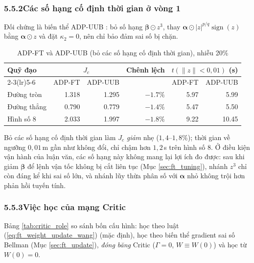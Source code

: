 \documentclass[12pt,a4paper]{article}
\makeatletter
\newcommand{\seclabel}[2]{\phantomsection\protected@edef\@currentlabel{#2}\label{#1}}
\DeclareMathOperator{\sign}{sign}
\makeatother
\begin{document}
\subsubsection*{5.5.2\quad Các số hạng cố định thời gian ở vòng 1}
\seclabel{sec:ft_terms}{5.5.2}

Đối chứng là biến thể ADP-UUB \cite{Wang2025}: bỏ số hạng $\bm\beta \odot z^3$, thay $\bm\alpha \odot |z|^{p/q}\sign(z)$ bằng $\bm\alpha \odot z$ và đặt $\kappa_2 = 0$, nên chỉ bảo đảm sai số bị chặn.

\begin{table}[H]
\centering
\caption{ADP-FT và ADP-UUB (bỏ các số hạng cố định thời gian), nhiễu 20\%}
\label{tab:ablation_uub}
\small
\begin{tabular}{lrrrrr}
\toprule
\multirow{2}{*}{\textbf{Quỹ đạo}} & \multicolumn{2}{c}{$J_c$} & \multirow{2}{*}{\textbf{Chênh lệch}} & \multicolumn{2}{c}{$t(\|z\| < 0{,}01)$ (s)} \\
\cmidrule(lr){2-3}\cmidrule(lr){5-6}
 & ADP-FT & ADP-UUB & & ADP-FT & ADP-UUB \\
\midrule
Đường tròn & 1.318 & 1.295 & $-1.7\%$ & 5.97 & 5.99 \\
Đường thẳng & 0.790 & 0.779 & $-1.4\%$ & 5.47 & 5.50 \\
Hình số 8 & 2.033 & 1.997 & $-1.8\%$ & 9.22 & 10.45 \\
\bottomrule
\end{tabular}
\end{table}

Bỏ các số hạng cố định thời gian làm $J_c$ \textit{giảm} nhẹ ($1{,}4$--$1{,}8\%$); thời gian về ngưỡng $0{,}01$\,m gần như không đổi, chỉ chậm hơn $1{,}2$\,s trên hình số 8. Ở điều kiện vận hành của luận văn, các số hạng này không mang lại lợi ích đo được: sau khi giảm $\bm\beta$ để lệnh vận tốc không bị cắt liên tục (Mục \ref{sec:ft_tuning}), nhánh $z^3$ chỉ còn đáng kể khi sai số lớn, và nhánh lũy thừa phân số với $\bm\alpha$ nhỏ không trội hơn phản hồi tuyến tính.

\subsubsection*{5.5.3\quad Việc học của mạng Critic}
\seclabel{sec:critic_results}{5.5.3}

Bảng \ref{tab:critic_role} so sánh bốn cấu hình: học theo luật (\ref{eq:ft_weight_update_wang}) (mặc định), học theo biến thể gradient sai số Bellman (Mục \ref{sec:ft_update}), \textit{đóng băng} Critic ($\Gamma = 0$, $W \equiv W(0)$) và học từ $W(0) = 0$.
\end{document}
